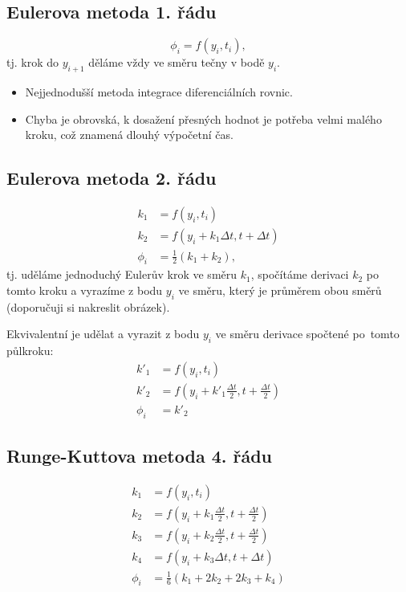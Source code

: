 \documentclass[a4paper,11pt,twoside]{article}
\theoremstyle{red}
\theoremstyle{green}
\begin{document}
\subsection{Eulerova metoda 1. řádu}
    \begin{equation}\label{eq:Euler1}
        \phi_{i}=f(y_{i},t_{i}),
    \end{equation}
    tj. krok do $y_{i+1}$ děláme vždy ve směru tečny v bodě $y_{i}$.

    \begin{itemize}
        \item Nejjednodušší metoda integrace diferenciálních rovnic.
        \item Chyba je obrovská, k dosažení přesných hodnot je potřeba velmi malého kroku, což znamená dlouhý výpočetní čas.
    \end{itemize}

\subsection{Eulerova metoda 2. řádu}
    \begin{align}\label{eq:Euler2a}
        k_{1}&=f(y_{i},t_{i})\nonumber\\
        k_{2}&=f\left(y_{i}+k_{1}\Delta t,t+\Delta t\right)\\
        \phi_{i}&=\frac{1}{2}\left(k_{1}+k_{2}\right),\nonumber
    \end{align}
    tj. uděláme jednoduchý Eulerův krok ve směru $k_{1}$, spočítáme derivaci $k_{2}$ po tomto kroku a vyrazíme z bodu $y_{i}$ ve směru, který je průměrem obou směrů (doporučuji si nakreslit obrázek).

    Ekvivalentní je udělat  a vyrazit z bodu $y_{i}$ ve směru derivace spočtené po~tomto půlkroku:
    \begin{align}\label{eq:Euler2b}
        k'_{1}&=f(y_{i},t_{i})\nonumber\\
        k'_{2}&=f\left(y_{i}+k'_{1}\frac{\Delta t}{2},t+\frac{\Delta t}{2}\right)\\
        \phi_{i}&=k'_{2}\nonumber
    \end{align}

\subsection{Runge-Kuttova metoda 4. řádu}
    \begin{align}\label{eq:RungeKutta}
        k_{1}&=f(y_{i},t_{i})\nonumber\\
        k_{2}&=f\left(y_{i}+k_{1}\frac{\Delta t}{2},t+\frac{\Delta t}{2}\right)\nonumber\\
        k_{3}&=f\left(y_{i}+k_{2}\frac{\Delta t}{2},t+\frac{\Delta t}{2}\right)\\
        k_{4}&=f\left(y_{i}+k_{3}\Delta t,t+\Delta t\right)\nonumber\\
        \phi_{i}&=\frac{1}{6}\left(k_{1}+2k_{2}+2k_{3}+k_{4}\right)\nonumber
    \end{align}
    
\end{document}
